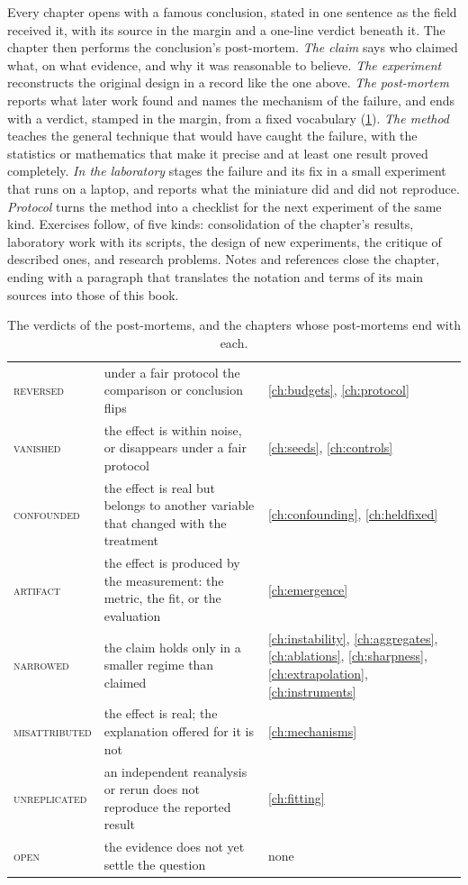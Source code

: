 \begin{refsection}

Every chapter opens with a famous conclusion, stated in one sentence as the field received it, with its source in the margin and a one-line verdict beneath it. The chapter then performs the conclusion's post-mortem. \emph{The claim} says who claimed what, on what evidence, and why it was reasonable to believe. \emph{The experiment} reconstructs the original design in a record like the one above. \emph{The post-mortem} reports what later work found and names the mechanism of the failure, and ends with a verdict, stamped in the margin, from a fixed vocabulary (\cref{tab:prologue:verdicts}). \emph{The method} teaches the general technique that would have caught the failure, with the statistics or mathematics that make it precise and at least one result proved completely. \emph{In the laboratory} stages the failure and its fix in a small experiment that runs on a laptop, and reports what the miniature did and did not reproduce. \emph{Protocol} turns the method into a checklist for the next experiment of the same kind. Exercises follow, of five kinds: consolidation of the chapter's results, laboratory work with its scripts, the design of new experiments, the critique of described ones, and research problems. Notes and references close the chapter, ending with a paragraph that translates the notation and terms of its main sources into those of this book.

\begin{table}[t]
\centering\small
\renewcommand{\arraystretch}{1.15}
\begin{tabularx}{\linewidth}{@{}>{\scshape\color{rubric}}l >{\raggedright\arraybackslash}X >{\raggedleft\arraybackslash}p{15mm}@{}}
\toprule
reversed & under a fair protocol the comparison or conclusion flips & \ref{ch:budgets}, \ref{ch:protocol}\\
vanished & the effect is within noise, or disappears under a fair protocol & \ref{ch:seeds}, \ref{ch:controls}\\
confounded & the effect is real but belongs to another variable that changed with the treatment & \ref{ch:confounding}, \ref{ch:heldfixed}\\
artifact & the effect is produced by the measurement: the metric, the fit, or the evaluation & \ref{ch:emergence}\\
narrowed & the claim holds only in a smaller regime than claimed & \ref{ch:instability}, \ref{ch:aggregates}, \ref{ch:ablations}, \ref{ch:sharpness}, \ref{ch:extrapolation}, \ref{ch:instruments}\\
misattributed & the effect is real; the explanation offered for it is not & \ref{ch:mechanisms}\\
unreplicated & an independent reanalysis or rerun does not reproduce the reported result & \ref{ch:fitting}\\
open & the evidence does not yet settle the question & none\\
\bottomrule
\end{tabularx}
\caption{The verdicts of the post-mortems, and the chapters whose post-mortems end with each.}\label{tab:prologue:verdicts}
\end{table}


\end{refsection}
